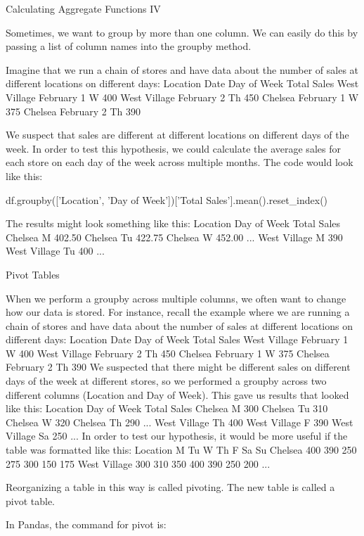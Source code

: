 \documentclass{journal}
\begin{document}
Calculating Aggregate Functions IV

Sometimes, we want to group by more than one column. We can easily do this by passing a list of column names into the groupby method.

Imagine that we run a chain of stores and have data about the number of sales at different locations on different days:
Location 	Date 	Day of Week 	Total Sales
West Village 	February 1 	W 	400
West Village 	February 2 	Th 	450
Chelsea 	February 1 	W 	375
Chelsea 	February 2 	Th 	390
		

We suspect that sales are different at different locations on different days of the week. In order to test this hypothesis, we could calculate the average sales for each store on each day of the week across multiple months. The code would look like this:

df.groupby(['Location', 'Day of Week'])['Total Sales'].mean().reset_index()

The results might look something like this:
Location 	Day of Week 	Total Sales
Chelsea 	M 	402.50
Chelsea 	Tu 	422.75
Chelsea 	W 	452.00
... 		
West Village 	M 	390
West Village 	Tu 	400
... 		
		
		

Pivot Tables

When we perform a groupby across multiple columns, we often want to change how our data is stored. For instance, recall the example where we are running a chain of stores and have data about the number of sales at different locations on different days:
Location 	Date 	Day of Week 	Total Sales
West Village 	February 1 	W 	400
West Village 	February 2 	Th 	450
Chelsea 	February 1 	W 	375
Chelsea 	February 2 	Th 	390
		We suspected that there might be different sales on different days of the week at different stores, so we performed a groupby across two different columns (Location and Day of Week). This gave us results that looked like this: 			
Location 	Day of Week 	Total Sales
Chelsea 	M 	300
Chelsea 	Tu 	310
Chelsea 	W 	320
Chelsea 	Th 	290
... 		
West Village 	Th 	400
West Village 	F 	390
West Village 	Sa 	250
... 		
		In order to test our hypothesis, it would be more useful if the table was formatted like this: 		
Location 	M 	Tu 	W 	Th 	F 	Sa 	Su
Chelsea 	400 	390 	250 	275 	300 	150 	175
West Village 	300 	310 	350 	400 	390 	250 	200
... 							

Reorganizing a table in this way is called pivoting. The new table is called a pivot table.

In Pandas, the command for pivot is:
\end{document}

